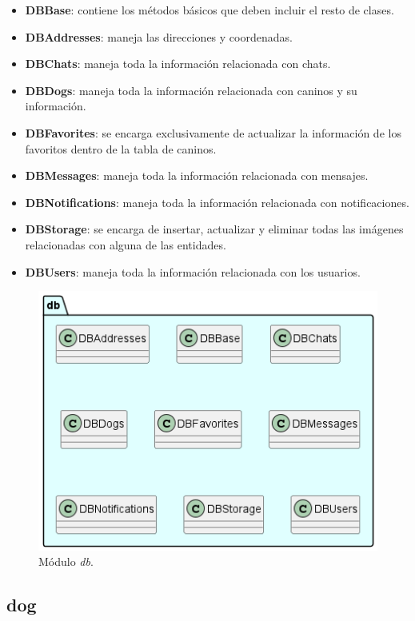 \documentclass[a4paper, 12pt]{article}
\begin{document}
\begin{itemize}[noitemsep]
	\item \textbf{DBBase}: contiene los métodos básicos que deben incluir el resto de clases.
	\item \textbf{DBAddresses}: maneja las direcciones y coordenadas.
	\item \textbf{DBChats}: maneja toda la información relacionada con chats.
	\item \textbf{DBDogs}: maneja toda la información relacionada con caninos y su información.
	\item \textbf{DBFavorites}: se encarga exclusivamente de actualizar la información de los favoritos dentro de la tabla de caninos.
	\item \textbf{DBMessages}: maneja toda la información relacionada con mensajes.
	\item \textbf{DBNotifications}: maneja toda la información relacionada con notificaciones.
	\item \textbf{DBStorage}: se encarga de insertar, actualizar y eliminar todas las imágenes relacionadas con alguna de las entidades.
	\item \textbf{DBUsers}: maneja toda la información relacionada con los usuarios.
\end{itemize}

\begin{figure}[H]
	\begin{center}
		{\includegraphics[width=0.7\linewidth]{diagram/DB.png}\par}
		\caption{Módulo  \textit{db}.}
	\end{center}
\end{figure}


\subsection*{dog}
\end{document}
